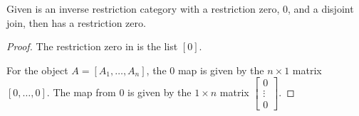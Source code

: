 \begin{lemma}\label{lem:imat_has_restriction_zero}
  Given \X is an inverse restriction category with a restriction zero, $0$, and a disjoint join,
  then \imatx has a restriction zero.
\end{lemma}
\begin{proof}
  The restriction zero in \imatx is the list $[0]$.

  For the object $A=[A_1,\ldots,A_n]$, the $0$ map is given by the $n\times 1$ matrix
  $[0,\ldots,0]$. The map from $0$ is given by the $1\times n$ matrix
  $\begin{bmatrix}0\\ \vdots\\ 0\end{bmatrix}$.

\end{proof}

